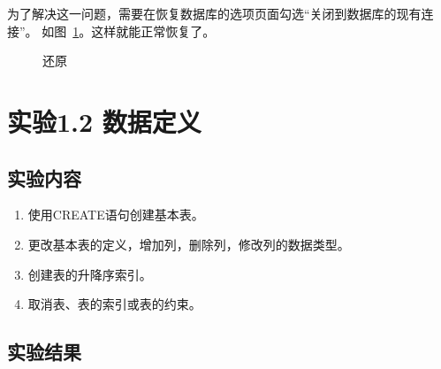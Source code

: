 \documentclass[a4paper,twoside]{article}
\begin{document}
\begin{spacing}{1.2}
为了解决这一问题，需要在恢复数据库的选项页面勾选“关闭到数据库的现有连接”。
如图~\ref{fig:recovery}。这样就能正常恢复了。
\begin{figure}[htbp]
    \centering
    \caption{还原}
    \label{fig:recovery}
\end{figure}


\clearpage

\section{实验1.2 数据定义}

\subsection{实验内容}

\begin{enumerate}
    \item 使用CREATE语句创建基本表。
    \item 更改基本表的定义，增加列，删除列，修改列的数据类型。
    \item 创建表的升降序索引。
    \item 取消表、表的索引或表的约束。
\end{enumerate}

\subsection{实验结果}


\end{spacing}
\end{document}
